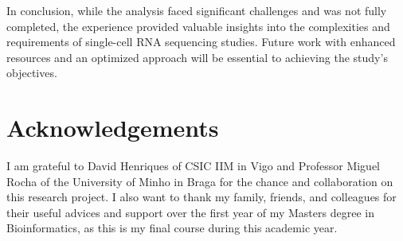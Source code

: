 \documentclass[runningheads]{llncs}
\begin{document}
In conclusion, while the analysis faced significant challenges and was not fully completed, the experience provided valuable insights into the complexities and requirements of single-cell RNA sequencing studies. Future work with enhanced resources and an optimized approach will be essential to achieving the study's objectives.

\section*{Acknowledgements}
I am grateful to David Henriques of CSIC IIM in Vigo and Professor Miguel Rocha of the University of Minho in Braga for the chance and collaboration on this research project. I also want to thank my family, friends, and colleagues for their useful advices and support over the first year of my Masters degree in Bioinformatics, as this is my final course during this academic year.

\newpage


\end{document}
